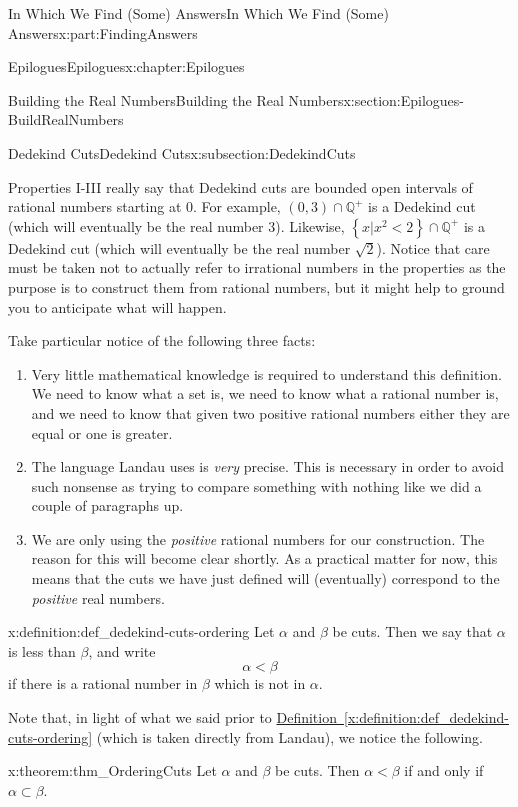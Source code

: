 \documentclass[oneside,10pt,]{book}
\newcommand{\xreffont}{\relax}
\numberwithin{equation}{section}
\newcommand{\QQ}{\mathbb {Q}}
\newcommand{\lt}{<}
\begin{document}
\begin{partptx}{In Which We Find (Some) Answers}{}{In Which We Find (Some) Answers}{}{}{x:part:FindingAnswers}
\begin{chapterptx}{Epilogues}{}{Epilogues}{}{}{x:chapter:Epilogues}
\begin{sectionptx}{Building the Real Numbers}{}{Building the Real Numbers}{}{}{x:section:Epilogues-BuildRealNumbers}
\begin{subsectionptx}{Dedekind Cuts}{}{Dedekind Cuts}{}{}{x:subsection:DedekindCuts}
%
\par
Properties I-III really say that Dedekind cuts are bounded open intervals of rational numbers starting at \(0\). For example, \((0,3)\cap\QQ^+\) is a Dedekind cut (which will eventually be the real number \(3\)). Likewise, \(\left\{x|x^2\lt 2\right\}\cap\QQ^+\) is a Dedekind cut (which will eventually be the real number \(\sqrt{2}\)). Notice that care must be taken not to actually refer to irrational numbers in the properties as the purpose is to construct them from rational numbers, but it might help to ground you to anticipate what will happen.%
\par
Take particular notice of the following three facts:%
\begin{enumerate}
\item{}Very little mathematical knowledge is required to understand this definition. We need to know what a set is, we need to know what a rational number is, and we need to know that given two positive rational numbers either they are equal or one is greater.%
\item{}The language Landau uses is \emph{very} precise. This is necessary in order to avoid such nonsense as trying to compare something with nothing like we did a couple of paragraphs up.%
\item{}We are only using the \emph{positive} rational numbers for our construction. The reason for this will become clear shortly. As a practical matter for now, this means that the cuts we have just defined will (eventually) correspond to the \emph{positive} real numbers.%
\end{enumerate}
%
\begin{definition}{}{x:definition:def_dedekind-cuts-ordering}%
 Let \(\alpha\) and \(\beta\) be cuts. Then we say that \(\alpha\) is less than \(\beta\), and write%
\begin{equation*}
\alpha\lt \beta
\end{equation*}
if there is a rational number in \(\beta\) which is not in \(\alpha\).%
\end{definition}
Note that, in light of what we said prior to \hyperref[x:definition:def_dedekind-cuts-ordering]{Definition~{\xreffont\ref{x:definition:def_dedekind-cuts-ordering}}} (which is taken directly from Landau), we notice the following.%
\begin{theorem}{}{}{x:theorem:thm_OrderingCuts}%
 Let \(\alpha\) and \(\beta\) be cuts. Then \(\alpha\lt \beta\) if and only if \(\alpha\subset\beta\).%

\end{theorem}
\end{subsectionptx}
\end{sectionptx}
\end{chapterptx}
\end{partptx}
\end{document}
